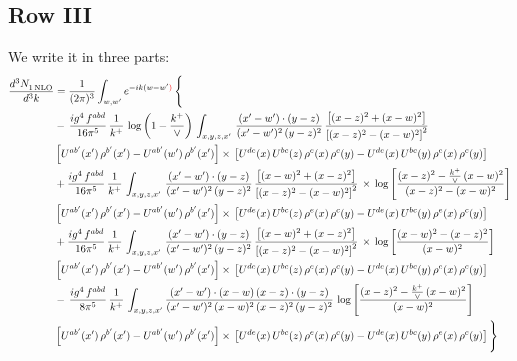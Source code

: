 \documentclass[9pt]{article}
\numberwithin{equation}{section}
\begin{document}
\subsection{Row III}
We write it in three parts:
\begin{align}
   \frac{d^{3}N_{1\,\rm NLO}^{\rm}}{d^{3}k}  & =  \frac{1}{(2\pi)^{3}}  \int_{w, w^\prime} e^{-ik(w-w^\prime{\color{red})}}\, \Bigg\{\notag \\
& -\,\frac{ig^{4}\,f^{abd}}{16\pi^{5}}\,\frac{1}{k^{+}}\,\log{\left(1-\frac{k^{+}}{\vee}\right)}\,\int_{x,y,z,x'}\, \frac{(x'-w')\cdot (y-z)}{(x'-w')^{2}\,(y-z)^{2}}\,\frac{\left[(x-z)^{2}+(x-w)^{2}\right]}{\left[(x-z)^{2}-(x-w)^{2}\right]^{2}}\notag \\ & \left[U^{ab'}(x')\,\rho^{b'}(x')-U^{ab'}(w')\, \rho^{b'}(x')\right]\times\, \left[U^{de}(x)\,U^{bc}(z)\, \rho^{e}(x)\,\rho^{c}(y)-U^{de}(x)\,U^{bc}(y)\,\rho^{e}(x)\,\rho^{c}(y)\right] \notag \\
&  +\frac{ig^{4}\,f^{abd}}{16\pi^{5}}\, \frac{1}{k^{+}}\,\int_{x,y,z,x'}\, \frac{(x'-w')\cdot (y-z)}{(x'-w')^{2}\,(y-z)^{2}}\, \frac{\left[(x-w)^{2}+(x-z)^{2}\right]}{\left[(x-z)^{2}-(x-w)^{2}\right]^{2}}\, \times\, \log{\left[\frac{(x-z)^{2}-\frac{k^{+}}{\vee}\,(x-w)^{2}}{(x-z)^{2}-(x-w)^{2}}\right]}\notag \\ & \left[U^{ab'}(x')\,\rho^{b'}(x')-U^{ab'}(w')\, \rho^{b'}(x')\right]\times\, \left[U^{de}(x)\,U^{bc}(z)\, \rho^{e}(x)\,\rho^{c}(y)-U^{de}(x)\,U^{bc}(y)\,\rho^{e}(x)\,\rho^{c}(y)\right] \notag \\
&  +\frac{ig^{4}\,f^{abd}}{16\pi^{5}}\, \frac{1}{k^{+}}\,\int_{x,y,z,x'}\, \frac{(x'-w')\cdot (y-z)}{(x'-w')^{2}\,(y-z)^{2}}\, \frac{\left[(x-w)^{2}+(x-z)^{2}\right]}{\left[(x-z)^{2}-(x-w)^{2}\right]^{2}}\, \times\, \log{\left[\frac{(x-w)^{2}-(x-z)^{2}}{(x-w)^{2}}\right]}\notag \\ & \left[U^{ab'}(x')\,\rho^{b'}(x')-U^{ab'}(w')\, \rho^{b'}(x')\right]\times\, \left[U^{de}(x)\,U^{bc}(z)\, \rho^{e}(x)\,\rho^{c}(y)-U^{de}(x)\,U^{bc}(y)\,\rho^{e}(x)\,\rho^{c}(y)\right] \notag \\
&-\, \frac{ig^{4}\,f^{abd}}{8\pi^{5}}\,\frac{1}{k^{+}}\,\int_{x,y,z,x'}\frac{(x'-w')\cdot (x-w)\, (x-z)\cdot (y-z)}{(x'-w')^{2}\, (x-w)^{2}\, (x-z)^{2}\, (y-z)^{2}}\,\log{\left[\frac{(x-z)^{2}-\frac{k^{+}}{\vee}\,(x-w)^{2}}{(x-w)^{2}}\right]} \notag \\ & \left[U^{ab'}(x')\,\rho^{b'}(x')-U^{ab'}(w')\, \rho^{b'}(x')\right]\times\, \left[U^{de}(x)\,U^{bc}(z)\, \rho^{e}(x)\,\rho^{c}(y)-U^{de}(x)\,U^{bc}(y)\,\rho^{e}(x)\,\rho^{c}(y)\right]\Bigg\}
\end{align}
\end{document}
